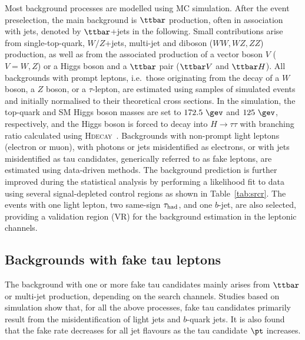 \documentclass[PAPER, coverpage, atlasdraft=true, texlive=2016, UKenglish]{\ATLASLATEXPATH atlasdoc} %
\begin{document}
Most background processes are modelled using MC simulation.
After the event preselection, the main background is $\ttbar$ production, often in association with jets, denoted by $\ttbar$+jets in the following.
Small contributions arise from single-top-quark, $W/Z$+jets, multi-jet and diboson ($WW,WZ,ZZ$) production, as well as from the associated 
production of a vector boson $V$ ($V=W,Z$) or a Higgs boson and a $\ttbar$ pair ($\ttbar V$ and $\ttbar H$). All backgrounds 
with prompt leptons, i.e.\ those originating from the decay of a $W$ boson, a $Z$ boson, or a $\tau$-lepton,
are estimated using samples of simulated events and initially normalised to their theoretical cross sections.
In the simulation, the top-quark and SM Higgs boson masses are set to $172.5~\gev$ and $125~\gev$, respectively,
and the Higgs boson is forced to decay into $H\to \tau\tau$ with branching ratio calculated using \textsc{Hdecay}~\cite{Djouadi:1997yw}.  
Backgrounds with non-prompt light leptons (electron or muon), with photons or jets misidentified as electrons, or with jets misidentified as tau candidates, 
generically referred to as fake leptons, are estimated using data-driven methods. 
The background prediction is further improved during the statistical analysis by performing a likelihood 
fit to data using several signal-depleted control regions as shown in Table~\ref{tab:srcr}.
The events with one light lepton, two same-sign $\tau_{\mathrm{had}}$, and one $b$-jet, are also selected, providing a validation region (VR) for the background estimation in the leptonic channels. 
\subsection{Backgrounds with fake tau leptons}
\label{sec:faketaus}
The background with one or more fake tau candidates mainly arises from $\ttbar$ or
multi-jet production, depending on the search channels.
Studies based on simulation show that, for all the above processes, fake tau candidates primarily result from the
misidentification of light jets and $b$-quark jets.
It is also found that the fake rate decreases for all jet flavours as the tau candidate $\pt$ increases.
\end{document}
